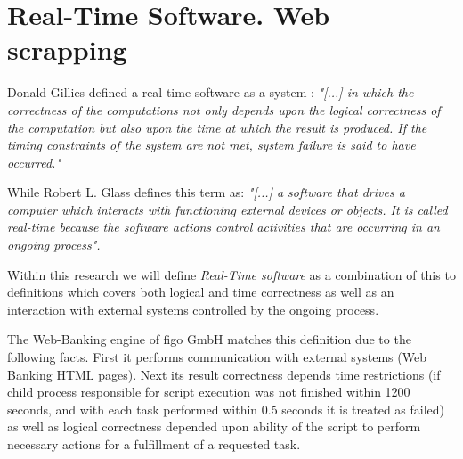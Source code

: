 \chapter{Real-Time Software. Web scrapping}
Donald Gillies defined a real-time software as a system : \textit{"[...] in which the correctness of the computations not only depends upon the logical correctness of the computation but also upon the time at which the result is produced. If the timing constraints of the system are not met, system failure is said to have occurred."}

While Robert L. Glass\cite{RealTimeTesting} defines this term as: \textit{"[...] a software that drives a computer which interacts with functioning external devices or objects. It is called real-time because the software actions control activities that are occurring in an ongoing process".}

Within this research we will define  \textit{Real-Time software} as a combination of this to definitions which covers both logical and time correctness as well as an interaction with external systems controlled by the ongoing process.

The Web-Banking engine of figo GmbH matches this definition due to the following facts. First it performs communication with external systems (Web Banking HTML pages). Next its result correctness depends time restrictions (if child process responsible for script execution was not finished within 1200 seconds, and with each task performed within 0.5 seconds it is treated as failed) as well as logical correctness depended upon ability of the script to perform necessary actions for a fulfillment of a requested task.





